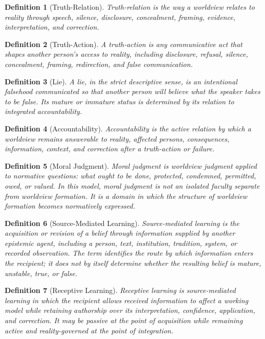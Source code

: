 \documentclass[11pt]{article}
\newtheorem{definition}{Definition}
\begin{document}
\begin{definition}[Truth-Relation]
Truth-relation is the way a worldview relates to reality through speech, silence, disclosure, concealment, framing, evidence, interpretation, and correction.
\end{definition}

\begin{definition}[Truth-Action]
A truth-action is any communicative act that shapes another person's access to reality, including disclosure, refusal, silence, concealment, framing, redirection, and false communication.
\end{definition}

\begin{definition}[Lie]
A lie, in the strict descriptive sense, is an intentional falsehood communicated so that another person will believe what the speaker takes to be false. Its mature or immature status is determined by its relation to integrated accountability.
\end{definition}

\begin{definition}[Accountability]
Accountability is the active relation by which a worldview remains answerable to reality, affected persons, consequences, information, context, and correction after a truth-action or failure.
\end{definition}

\begin{definition}[Moral Judgment]
Moral judgment is worldview judgment applied to normative questions: what ought to be done, protected, condemned, permitted, owed, or valued. In this model, moral judgment is not an isolated faculty separate from worldview formation. It is a domain in which the structure of worldview formation becomes normatively expressed.
\end{definition}

\begin{definition}[Source-Mediated Learning]
Source-mediated learning is the acquisition or revision of a belief through information supplied by another epistemic agent, including a person, text, institution, tradition, system, or recorded observation. The term identifies the route by which information enters the recipient; it does not by itself determine whether the resulting belief is mature, unstable, true, or false.
\end{definition}

\begin{definition}[Receptive Learning]
Receptive learning is source-mediated learning in which the recipient allows received information to affect a working model while retaining authorship over its interpretation, confidence, application, and correction. It may be passive at the point of acquisition while remaining active and reality-governed at the point of integration.
\end{definition}
\end{document}
